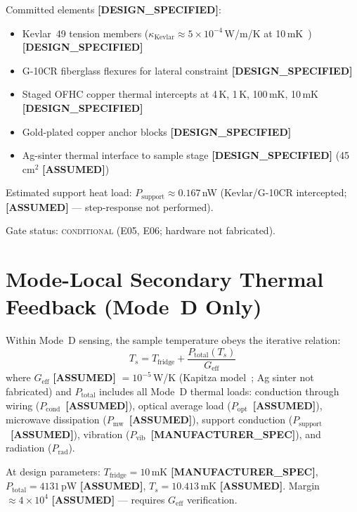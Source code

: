 \documentclass[12pt,a4paper]{article}
\newcommand{\conditional}{\textsc{conditional}}
\newcommand{\assumed}{\textbf{[ASSUMED]}}
\newcommand{\designspec}{\textbf{[DESIGN\_SPECIFIED]}}
\newcommand{\mfrspec}{\textbf{[MANUFACTURER\_SPEC]}}
\begin{document}
Committed elements \designspec{}:
\begin{itemize}[noitemsep]
  \item Kevlar~49 tension members ($\kappa_\mathrm{Kevlar} \approx 5\times10^{-4}$\,W/m/K at 10\,mK~\cite{Barucci2005}) \designspec{}
  \item G-10CR fiberglass flexures for lateral constraint \designspec{}
  \item Staged OFHC copper thermal intercepts at 4\,K, 1\,K, 100\,mK, 10\,mK \designspec{}
  \item Gold-plated copper anchor blocks \designspec{}
  \item Ag-sinter thermal interface to sample stage \designspec{} (45\,cm$^2$ \assumed{})
\end{itemize}

Estimated support heat load: $P_\mathrm{support} \approx 0.167$\,nW
(Kevlar/G-10CR intercepted; \assumed{} --- step-response not performed).

Gate status: \conditional{} (E05, E06; hardware not fabricated).

\section{Mode-Local Secondary Thermal Feedback (Mode~D Only)}
\label{sec:thermal}

Within Mode~D sensing, the sample temperature obeys the iterative relation:
\begin{equation}
  T_s = T_\mathrm{fridge} + \frac{P_\mathrm{total}(T_s)}{G_\mathrm{eff}}
\end{equation}
where $G_\mathrm{eff}$ \assumed{} $= 10^{-5}$\,W/K (Kapitza model~\cite{SwartzPohl1989,Pobell2007};
Ag sinter not fabricated) and $P_\mathrm{total}$ includes all Mode~D thermal loads:
conduction through wiring ($P_\mathrm{cond}$~\assumed{}), optical average load
($P_\mathrm{opt}$~\assumed{}), microwave dissipation ($P_\mathrm{mw}$~\assumed{}),
support conduction ($P_\mathrm{support}$~\assumed{}), vibration ($P_\mathrm{vib}$~\mfrspec{}),
and radiation ($P_\mathrm{rad}$).

At design parameters: $T_\mathrm{fridge} = 10$\,mK \mfrspec{},
$P_\mathrm{total} = 4131$\,pW \assumed{},
$T_s = 10.413$\,mK \assumed{}.
Margin $\approx 4\times10^4$ \assumed{} --- requires $G_\mathrm{eff}$ verification.
\end{document}
